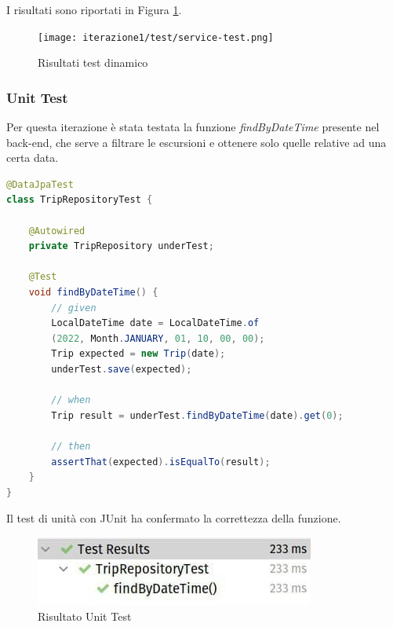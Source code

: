 I risultati sono riportati in Figura \ref{Risultati test dinamico iterazione 1}. 

\begin{figure}[htbp]
    \texttt{[image: iterazione1/test/service-test.png]}
    \centering
    \caption{Risultati test dinamico}
    \label{Risultati test dinamico iterazione 1}
\end{figure}
\subsubsection{Unit Test}
Per questa iterazione è stata testata la funzione \textit{findByDateTime} presente nel back-end, che serve a filtrare le escursioni e ottenere solo quelle relative ad una certa data.

\begin{lstlisting}[language=Java]
@DataJpaTest
class TripRepositoryTest {

    @Autowired
    private TripRepository underTest;

    @Test
    void findByDateTime() {
        // given
        LocalDateTime date = LocalDateTime.of
        (2022, Month.JANUARY, 01, 10, 00, 00);
        Trip expected = new Trip(date);
        underTest.save(expected);

        // when
        Trip result = underTest.findByDateTime(date).get(0);

        // then
        assertThat(expected).isEqualTo(result);
    }
}
\end{lstlisting}

Il test di unità con JUnit ha confermato la correttezza della funzione. 

\begin{figure}[htbp]
    \includegraphics[width=\textwidth]{images/iterazione1/test/unit-test.jpg}
    \centering
    \caption{Risultato Unit Test}
    \label{test jUnit findByDateTime}
\end{figure}

